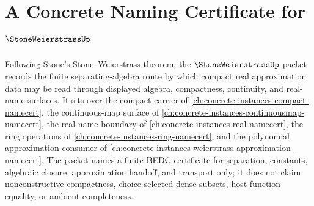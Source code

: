 \chapter{A Concrete Naming Certificate for $\StoneWeierstrassUp$}
\label{ch:concrete-instances-stone-weierstrass-namecert}

Following Stone's Stone--Weierstrass theorem, the $\StoneWeierstrassUp$ packet records the finite separating-algebra route by which compact real approximation data may be read through displayed algebra, compactness, continuity, and real-name surfaces. It sits over the compact carrier of \autoref{ch:concrete-instances-compact-namecert}, the continuous-map surface of \autoref{ch:concrete-instances-continuousmap-namecert}, the real-name boundary of \autoref{ch:concrete-instances-real-namecert}, the ring operations of \autoref{ch:concrete-instances-ring-namecert}, and the polynomial approximation consumer of \autoref{ch:concrete-instances-weierstrass-approximation-namecert}. The packet names a finite BEDC certificate for separation, constants, algebraic closure, approximation handoff, and transport only; it does not claim nonconstructive compactness, choice-selected dense subsets, host function equality, or ambient completeness.

